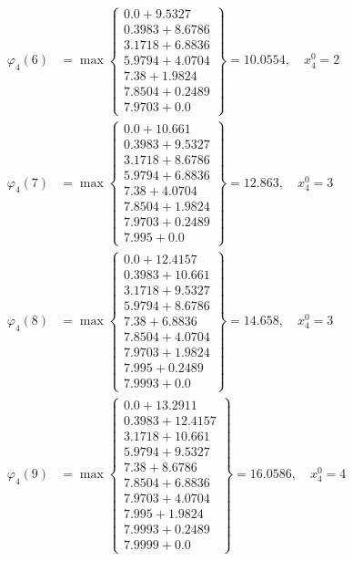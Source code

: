 \documentclass{article}
\begin{document}
\begin{align*}
  
  
  
\varphi_{4}(6) &= \max \left\{ \begin{array}{c}
0.0 + 9.5327 \\
 0.3983 + 8.6786 \\
 3.1718 + 6.8836 \\
 5.9794 + 4.0704 \\
 7.38 + 1.9824 \\
 7.8504 + 0.2489 \\
 7.9703 + 0.0
\end{array} \right\}=10.0554,\quad x_{4}^0=2\\
  
  
  
  
\varphi_{4}(7) &= \max \left\{ \begin{array}{c}
0.0 + 10.661 \\
 0.3983 + 9.5327 \\
 3.1718 + 8.6786 \\
 5.9794 + 6.8836 \\
 7.38 + 4.0704 \\
 7.8504 + 1.9824 \\
 7.9703 + 0.2489 \\
 7.995 + 0.0
\end{array} \right\}=12.863,\quad x_{4}^0=3\\
  
  
  
  
\varphi_{4}(8) &= \max \left\{ \begin{array}{c}
0.0 + 12.4157 \\
 0.3983 + 10.661 \\
 3.1718 + 9.5327 \\
 5.9794 + 8.6786 \\
 7.38 + 6.8836 \\
 7.8504 + 4.0704 \\
 7.9703 + 1.9824 \\
 7.995 + 0.2489 \\
 7.9993 + 0.0
\end{array} \right\}=14.658,\quad x_{4}^0=3\\
  
  
  
  
\varphi_{4}(9) &= \max \left\{ \begin{array}{c}
0.0 + 13.2911 \\
 0.3983 + 12.4157 \\
 3.1718 + 10.661 \\
 5.9794 + 9.5327 \\
 7.38 + 8.6786 \\
 7.8504 + 6.8836 \\
 7.9703 + 4.0704 \\
 7.995 + 1.9824 \\
 7.9993 + 0.2489 \\
 7.9999 + 0.0
\end{array} \right\}=16.0586,\quad x_{4}^0=4\\
  

\end{align*}
\end{document}
